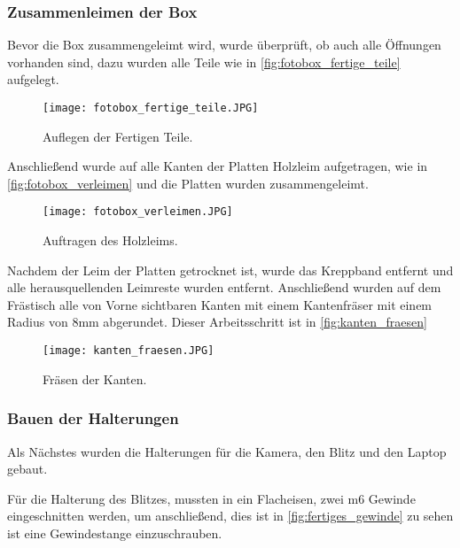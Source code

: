 \newpage

\subsubsection{Zusammenleimen der Box}

Bevor die Box zusammengeleimt wird, wurde überprüft, ob auch alle Öffnungen 
vorhanden sind, dazu wurden alle Teile wie in \autoref{fig:fotobox_fertige_teile}
aufgelegt. 

\begin{figure}[H]
    \centering
    \texttt{[image: fotobox\_fertige\_teile.JPG]}
    \caption{Auflegen der Fertigen Teile.}
    \label{fig:fotobox_fertige_teile}
\end{figure}

Anschließend wurde auf alle Kanten der Platten Holzleim aufgetragen, wie in 
\autoref{fig:fotobox_verleimen} und die Platten wurden zusammengeleimt.

\begin{figure}[H]
    \centering
    \texttt{[image: fotobox\_verleimen.JPG]}
    \caption{Auftragen des Holzleims.}
    \label{fig:fotobox_verleimen}
\end{figure}

\newpage

Nachdem der Leim der Platten getrocknet ist, wurde das Kreppband entfernt und
alle herausquellenden Leimreste wurden entfernt. Anschließend wurden auf 
dem Frästisch alle von Vorne sichtbaren Kanten mit einem Kantenfräser mit einem
Radius von 8mm abgerundet. Dieser Arbeitsschritt ist in \autoref{fig:kanten_fraesen}

\begin{figure}[H]
    \centering
    \texttt{[image: kanten\_fraesen.JPG]}
    \caption{Fräsen der Kanten.}
    \label{fig:kanten_fraesen}
\end{figure}

\newpage

\subsubsection{Bauen der Halterungen}

Als Nächstes wurden die Halterungen für die Kamera, den Blitz und den Laptop gebaut.


Für die Halterung des Blitzes, mussten in ein Flacheisen, zwei m6 Gewinde
eingeschnitten werden, um anschließend, dies ist in \autoref{fig:fertiges_gewinde}
zu sehen ist eine Gewindestange einzuschrauben.

